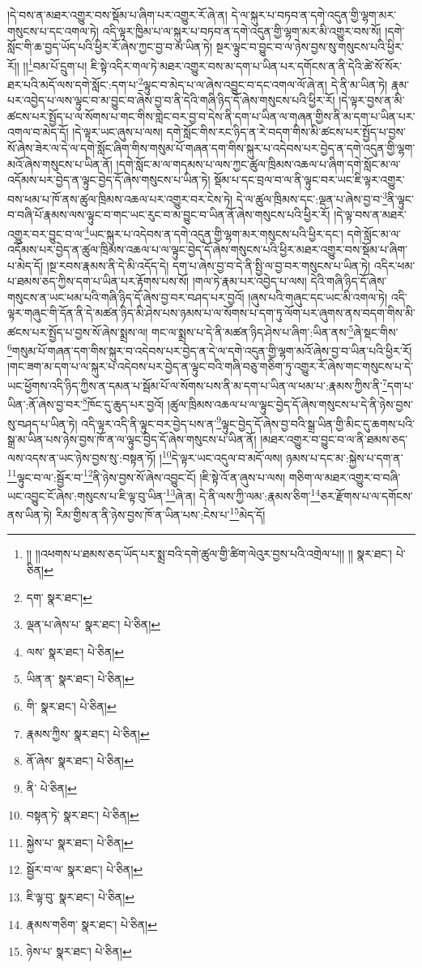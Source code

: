 །དེ་བས་ན་མཐར་འགྱུར་བས་སྡོམ་པ་ཞིག་པར་འགྱུར་རོ་ཞེ་ན། དེ་ལ་སྐུར་པ་བཏབ་ན་དགེ་འདུན་གྱི་ལྷག་མར་གསུངས་པ་དང་འགལ་ཏེ། འདི་ལྟར་ཁྱིམ་པ་ལ་སྐུར་པ་བཏབ་ན་དགེ་འདུན་གྱི་ལྷག་མར་མི་འགྱུར་བས་སོ། །དགེ་སློང་གི་ཆ་བྱད་ཡོད་པའི་ཕྱིར་རོ་ཞེས་ཀྱང་བྱ་བ་མ་ཡིན་ཏེ། སྔར་ལྟུང་བ་བྱུང་བ་ལ་ཉེས་བྱས་སུ་གསུངས་པའི་ཕྱིར་རོ།། །།\footnote{།། །།འཕགས་པ་ཐམས་ཅད་ཡོད་པར་སྨྲ་བའི་དགེ་ཚུལ་གྱི་ཚིག་ལེའུར་བྱས་པའི་འགྲེལ་པ།། །།  སྣར་ཐང་།  པེ་ཅིན། }བམ་པོ་དྲུག་པ། ཇི་སྟེ་འདིར་གལ་ཏེ་མཐར་འགྱུར་བས་མ་དག་པ་ཡིན་པར་དགོངས་ན་ནི་དེའི་ཚེ་སོ་སོར་ཐར་པའི་མདོ་ལས་དགེ་སློང་:དག་པ་\footnote{དག་  སྣར་ཐང་། }ལྟུང་བ་མེད་པ་ལ་ཞེས་འབྱུང་བ་དང་འགལ་ལོ་ཞེ་ན། དེ་ནི་མ་ཡིན་ཏེ། རྣམ་པར་འབྱེད་པ་ལས་ལྟུང་བ་མ་བྱུང་བ་ཞེས་བྱ་བ་ནི་དེའི་གཞི་ཉིད་དོ་ཞེས་གསུངས་པའི་ཕྱིར་རོ། །དེ་ལྟར་བྱས་ན་མི་ཚངས་པར་སྤྱོད་པ་ལ་སོགས་པ་གང་གིས་གླེང་བར་བྱ་བ་དེས་ནི་དག་པ་ཡིན་ལ་གཞན་གྱིས་ནི་མ་དག་པ་ཡིན་པར་འགལ་བ་མེད་དོ། །དེ་ལྟར་ཡང་ཞུས་པ་ལས། དགེ་སློང་གིས་རང་ཉིད་ན་རེ་བདག་གིས་མི་ཚངས་པར་སྤྱོད་པ་བྱས་སོ་ཞེས་ཟེར་ལ་དེ་ལ་དགེ་སློང་ཞིག་གིས་གསུམ་པོ་གཞན་དག་གིས་སྐུར་པ་འདེབས་པར་བྱེད་ན་དགེ་འདུན་གྱི་ལྷག་མའོ་ཞེས་གསུངས་པ་ཡིན་ནོ། །དགེ་སློང་མ་ལ་གདམས་པ་ལས་ཀྱང་ཚུལ་ཁྲིམས་འཆལ་པ་ཞིག་དགེ་སློང་མ་ལ་འདོམས་པར་བྱེད་ན་ལྟུང་བྱེད་དོ་ཞེས་གསུངས་པ་ཡིན་ཏེ། སྡོམ་པ་དང་བྲལ་བ་ལ་ནི་ལྟུང་བར་ཡང་ཇི་ལྟར་འགྱུར་བས་ཕམ་པ་ཁོ་ནས་ཚུལ་ཁྲིམས་འཆལ་པར་འགྱུར་བར་ངེས་ཏེ། དེ་ལ་ཚུལ་ཁྲིམས་དང་:ལྡན་པ་ཞེས་བྱ་བ་\footnote{ལྡན་པ་ཞེས་པ་  སྣར་ཐང་།  པེ་ཅིན། }ནི་ལྟུང་བ་བཞི་པོ་རྣམས་ལས་ལྟུང་བ་གང་ཡང་རུང་བ་མ་བྱུང་བ་ཡིན་ནོ་ཞེས་གསུངས་པའི་ཕྱིར་རོ། །དེ་ལྟ་བས་ན་མཐར་འགྱུར་བར་བྱུང་བ་ལ་\footnote{ལས་  སྣར་ཐང་།  པེ་ཅིན། }ཡང་སྐུར་པ་འདེབས་ན་དགེ་འདུན་གྱི་ལྷག་མར་གསུངས་པའི་ཕྱིར་དང་། དགེ་སློང་མ་ལ་འདོམས་པར་བྱེད་ན་ཚུལ་ཁྲིམས་འཆལ་པ་ལ་ལྟུང་བྱེད་དོ་ཞེས་གསུངས་པའི་ཕྱིར་མཐར་འགྱུར་བས་སྡོམ་པ་ཞིག་པ་མེད་དོ། །སྔ་རབས་རྣམས་ནི་དེ་མི་འདོད་དེ། དག་པ་ཞེས་བྱ་བ་དེ་ནི་སྤྱི་ལ་བྱ་བར་གསུངས་པ་ཡིན་ཏེ། འདིར་ཕམ་པ་ཐམས་ཅད་ཀྱིས་དག་པ་ཡིན་པར་རྟོགས་པས་སོ། །གལ་ཏེ་རྣམ་པར་འབྱེད་པ་ལས། དེའི་གཞི་ཉིད་དོ་ཞེས་གསུངས་ན་ཡང་ཕམ་པའི་གཞི་ཉིད་དོ་ཞེས་བྱ་བར་བཤད་པར་བྱའོ། །ཞུས་པའི་གཞུང་དང་ཡང་མི་འགལ་ཏེ། འདི་ལྟར་གཞུང་གི་དོན་ནི་དེ་མཚན་ཉིད་མི་ཤེས་པས་ཉམས་པ་ལ་སོགས་པ་དག་ཏུ་ལོག་པར་ཞུགས་ནས་བདག་གིས་མི་ཚངས་པར་སྤྱོད་པ་བྱས་སོ་ཞེས་སྨྲས་ལ། གང་ལ་སྨྲས་པ་དེ་ནི་མཚན་ཉིད་ཤེས་པ་ཞིག་:ཡིན་ནས་\footnote{ཡིན་ན་  སྣར་ཐང་།  པེ་ཅིན། }ཞེ་སྡང་གིས་\footnote{གི་  སྣར་ཐང་།  པེ་ཅིན། }གསུམ་པོ་གཞན་དག་གིས་སྐུར་བ་འདེབས་པར་བྱེད་ན་དེ་ལ་དགེ་འདུན་གྱི་ལྷག་མའོ་ཞེས་བྱ་བ་ཡིན་པའི་ཕྱིར་རོ། །གང་ཟག་མ་དག་པ་ལ་སྐུར་པ་འདེབས་པར་བྱེད་ན་ལྟུང་བའི་གཞི་བཅུ་གཅིག་ཏུ་འགྱུར་རོ་ཞེས་གང་གསུངས་པ་དེ་ཡང་ཕྱོགས་འདི་ཉིད་ཀྱིས་ན་དམན་པ་སྦོམ་པོ་ལ་སོགས་པས་ནི་མ་དག་པ་ཡིན་ལ་ཕམ་པ་:རྣམས་ཀྱིས་ནི་\footnote{རྣམས་ཀྱིས་  སྣར་ཐང་།  པེ་ཅིན། }དག་པ་ཡིན་:ནོ་ཞེས་བྱ་བར་\footnote{ནོ་ཞེས་  སྣར་ཐང་།  པེ་ཅིན། }ཁོང་དུ་ཆུད་པར་བྱའོ། །ཚུལ་ཁྲིམས་འཆལ་པ་ལ་ལྟུང་བྱེད་དོ་ཞེས་གསུངས་པ་དེ་ནི་ཉེས་བྱས་སུ་བཤད་པ་ཡིན་ཏེ། འདི་ལྟར་འདི་ནི་ལྟུང་བར་བྱེད་པས་ན་\footnote{ནི་  པེ་ཅིན། }ལྟུང་བྱེད་དོ་ཞེས་བྱ་བའི་སྒྲ་ཡིན་གྱི་མིང་དུ་ཆགས་པའི་སྒྲ་མ་ཡིན་པས་ཉེས་བྱས་ཁོ་ན་ལ་ལྟུང་བྱེད་དོ་ཞེས་གསུངས་པ་ཡིན་ནོ། །མཐར་འགྱུར་བ་བྱུང་བ་ལ་ནི་ཐམས་ཅད་ལས་འདས་ན་ཡང་ཉེས་བྱས་སུ་:བསྟན་ཏོ། །\footnote{བསྟན་ཏེ་  སྣར་ཐང་།  པེ་ཅིན། }དེ་ལྟར་ཡང་འདུལ་བ་མདོ་ལས། ཉམས་པ་དང་མ་:སྐྱེས་པ་དག་ན་\footnote{སྐྱེས་པ་  སྣར་ཐང་།  པེ་ཅིན། }ལྟུང་བ་ལ་:སྦྱོར་བ་\footnote{སྦྱོར་བ་ལ་  སྣར་ཐང་།  པེ་ཅིན། }ནི་ཉེས་བྱས་སོ་ཞེས་འབྱུང་ངོ། །ཇི་སྟེ་འོ་ན་ཞུས་པ་ལས། གཅིག་ལ་མཐར་འགྱུར་བ་བཞི་ཡང་འབྱུང་ངོ་ཞེས་:གསུངས་པ་ཇི་ལྟ་བུ་ཡིན་\footnote{ཇི་ལྟ་བུ་  སྣར་ཐང་།  པེ་ཅིན། }ཞེ་ན། དེ་ནི་ལས་ཀྱི་ལམ་:རྣམས་ཅིག་\footnote{རྣམས་གཅིག་  སྣར་ཐང་།  པེ་ཅིན། }ཅར་རྫོགས་པ་ལ་དགོངས་ནས་ཡིན་ཏེ། རིམ་གྱིས་ན་ནི་ཉེས་བྱས་ཁོ་ན་ཡིན་པས་:ངེས་པ་\footnote{ཉེས་པ་  སྣར་ཐང་།  པེ་ཅིན། }མེད་དོ། 